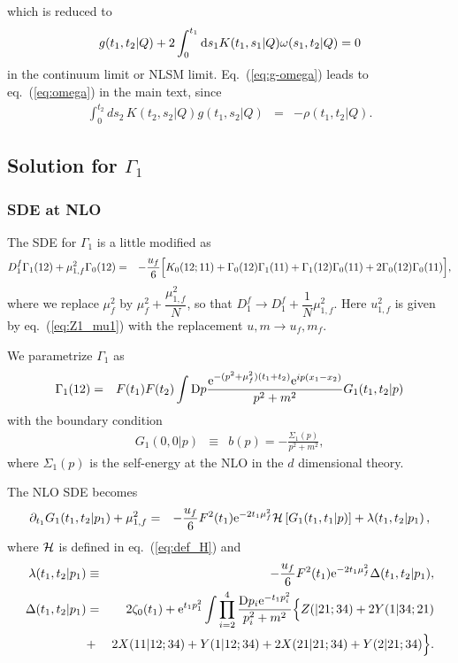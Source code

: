 \documentclass[preprint]{ptephy_v1}%
\newcommand{\rme}{{\rm e}}
\newcommand{\rmd}{{\rm d}}
\newcommand{\rmD}{{\rm D}}
\begin{document}
which is reduced to
\begin{eqnarray}
g(t_1,t_2\vert  Q) + 2\int_0^{t_1} \rmd s_1 K(t_1,s_1\vert  Q) \omega(s_1,t_2\vert  Q)
= 0 
\label{eq:g-omega}
\end{eqnarray}
in the continuum limit  or NLSM limit. 
Eq.~(\ref{eq:g-omega}) leads to eq.~(\ref{eq:omega}) in the main text, 
since
\begin{eqnarray}
\int_0^{t_2} ds_2\, K(t_2,s_2\vert Q) g(t_1,s_2\vert Q) &=& - \rho(t_1,t_2\vert Q).
\end{eqnarray}

\subsection{Solution for $\Gamma_1$}
\subsubsection{SDE at NLO}
The SDE for $\Gamma_1$ is a little  modified as
\begin{eqnarray}
D_1^f \Gamma_1(12) +\mu_{1,f}^2 \Gamma_0(12)&=& -\frac{u_f}{6}\Bigl[ K_0(12;11)+\Gamma_0(12)\Gamma_1(11) +\Gamma_1(12)\Gamma_0(11) + 2\Gamma_0(12)\Gamma_0(11)\Bigr], \nonumber \\
\end{eqnarray}
where we replace $\mu_f^2$ by $\mu_f^2+\dfrac{\mu_{1,f}^2}{N}$, so that
$D_1^f \rightarrow D_1^f +\dfrac{1}{N} \mu_{1,f}^2 $.
 Here $u_{1,f}^2$ is given by eq.~(\ref{eq:Z1_mu1}) with the replacement $u,m \rightarrow u_f, m_f$.

We parametrize $\Gamma_1$ as
\begin{eqnarray}
\Gamma_1(12) &=& F(t_1)F(t_2)\int \rmD p\frac{\rme^{-(p^2+\mu_f^2)(t_1+t_2)}\rme^{ip(x_1-x_2)}}{p^2+m^2} G_1(t_1,t_2\vert p) 
\end{eqnarray}
with the boundary condition 
\begin{eqnarray}
G_1(0,0\vert p) &\equiv& b(p) = -\frac{\Sigma_1(p)}{p^2+m^2} , 
\end{eqnarray}
where $\Sigma_1(p)$ is the self-energy at the NLO in the $d$  dimensional theory.

The NLO SDE becomes
\begin{eqnarray}
\partial_{t_1} G_1(t_1,t_2\vert  p_1) + \mu_{1,f}^2&=&   -\frac{u_f}{6}F^2(t_1)\rme^{-2t_1\mu_f^2}
{\cal H}\left[G_1(t_1,t_1|p)\right] + \lambda(t_1,t_2|p_1)\,,
\label{eq:G1}
\end{eqnarray}
where  ${\cal H}$ is defined in eq.~(\ref{eq:def_H})  and
\begin{eqnarray}
\lambda(t_1,t_2\vert p_1) &\equiv&
 -\frac{u_f}{6}F^2(t_1) \rme^{-2t_1\mu_f^2}\Delta(t_1,t_2\vert p_1), \\
\Delta(t_1,t_2\vert p_1) &=& 2 \zeta_0(t_1)
+\rme^{t_1p_1^2}\int \prod_{i=2}^4 
\frac{\rmD p_i \rme^{-t_1 p_i^2}}{p_i^2+m^2}\Bigl\{  Z(\vert 21;34) +2Y(1\vert 34;21) \nonumber \\
&+&2X(11\vert 12;34) +Y(1\vert12;34)+2X(21\vert 21;34) + Y(2\vert 21;34)\Bigr\} .
\end{eqnarray}
\end{document}
